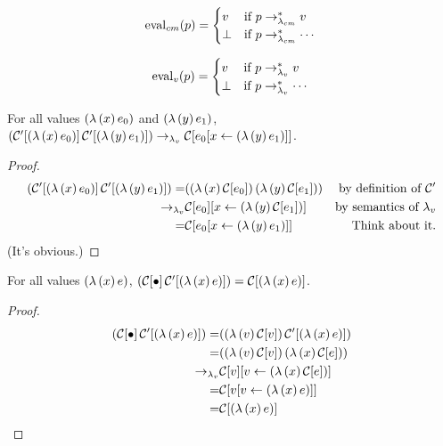 \begin{definition}
\[
\mathrm{eval}_{cm}(p)=\begin{cases}
v     &\text{if $p\rightarrow_{\lambda_{cm}}^{*} v$}\\
\perp &\text{if $p\rightarrow_{\lambda_{cm}}^{*}\cdots$}
\end{cases}
\]
\end{definition}

\begin{definition}
\[
\mathrm{eval}_{v}(p)=\begin{cases}
v     &\text{if $p\rightarrow_{\lambda_v}^{*} v$}\\
\perp &\text{if $p\rightarrow_{\lambda_v}^{*}\cdots$}
\end{cases}
\]
\end{definition}

\begin{lemma}
\label{cm-app}
For all values $(\lambda\,(x)\,e_0)$ and $(\lambda\,(y)\,e_1)$, $(\mathcal{C}'[(\lambda\,(x)\,e_0)]\,\mathcal{C}'[(\lambda\,(y)\,e_1)])\rightarrow_{\lambda_v}\mathcal{C}[e_0[x\leftarrow (\lambda\,(y)\,e_1)]]$.
\end{lemma}

\begin{proof}
\begin{align*}
(\mathcal{C}'[(\lambda\,(x)\,e_0)]\,\mathcal{C}'[(\lambda\,(y)\,e_1)]) = &((\lambda\,(x)\,\mathcal{C}[e_0])\,(\lambda\,(y)\,\mathcal{C}[e_1]))&\text{by definition of $\mathcal{C}'$}\\
                                       \rightarrow_{\lambda_v} &\mathcal{C}[e_0][x\leftarrow (\lambda\,(y)\,\mathcal{C}[e_1])]&\text{by semantics of $\lambda_v$}\\
                                           = &\mathcal{C}[e_0[x\leftarrow (\lambda\,(y)\,e_1)]]&\text{Think about it.}
\end{align*}
(It's obvious.)
\end{proof}

\begin{lemma}
\label{hole-context-to-value}
For all values $(\lambda\,(x)\,e)$, $(\mathcal{C}[\bullet]\,\mathcal{C}'[(\lambda\,(x)\,e)])=\mathcal{C}[(\lambda\,(x)\,e)]$.
\end{lemma}

\begin{proof}
\begin{align*}
(\mathcal{C}[\bullet]\,\mathcal{C}'[(\lambda\,(x)\,e)]) = &((\lambda\,(v)\,\mathcal{C}[v])\,\mathcal{C}'[(\lambda\,(x)\,e)])\\
                                 = &((\lambda\,(v)\,\mathcal{C}[v])\,(\lambda\,(x)\,\mathcal{C}[e]))\\
                             \rightarrow_{\lambda_v} &\mathcal{C}[v][v\leftarrow (\lambda\,(x)\,\mathcal{C}[e])]\\
                                 = &\mathcal{C}[v[v\leftarrow (\lambda\,(x)\,e)]]\\
                                 = &\mathcal{C}[(\lambda\,(x)\,e)]
\end{align*}
\end{proof}

